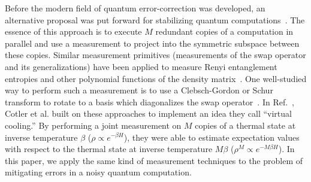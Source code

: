 \documentclass[
amsmath,
amssymb,
aps,
pra,
reprint,
twocolumn,
superscriptaddress,
longbibliography,
showkeys,
floatfix
]{revtex4-1}
\newcommand{\replace}[2]{#2}
\def\tr{\mathrm{Tr}}
\begin{document}
Before the modern field of quantum error-correction was developed, an
alternative proposal was put forward for stabilizing quantum
computations~\cite{Berthiaume1994-ln, Barenco1997-do, Peres1999-rt}. 
The essence of this approach is to execute \(M\) redundant copies of a
computation in parallel and use a measurement to project into the symmetric
subspace between these copies. 
%
Similar measurement primitives (measurements of the swap operator and its
generalizations) have been applied to measure Renyi entanglement entropies and
other polynomial functions of the density matrix~\cite{Horodecki2002-pf,
  Ekert2002-gl, Brun2004-do, Hastings2010-tk, Islam2015-hn,
  Garcia-Escartin2013-en, Johri2017-jm, Subasi2019-dd, Banchi2016-we}.
One well-studied way to perform such a measurement is to use a Clebsch-Gordon or
Schur transform to rotate to a basis which diagonalizes the swap
operator~\cite{Bacon2006-xz}.
In Ref.~, Cotler et al. 
built on these approaches to implement an idea they call ``virtual cooling.''
By performing a joint measurement on \(M\) copies of a thermal state at inverse
temperature \(\beta\) (\(\rho \propto e^{-\beta H}\)), they were able to
estimate expectation values with respect to the thermal state at inverse
temperature \(M \beta\) (\(\rho^M \propto e^{-M\beta H}\)). 
In this paper, we apply the same kind of measurement techniques to the problem
of mitigating errors in a noisy quantum computation.
\end{document}
